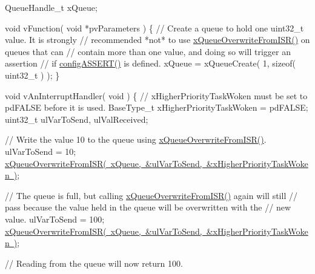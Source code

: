 \begin{DoxyPre} QueueHandle\_t xQueue;\end{DoxyPre}



\begin{DoxyPre} void vFunction( void *pvParameters )
 \{
    // Create a queue to hold one uint32\_t value.  It is strongly
    // recommended *not* to use \mbox{\hyperlink{queue_8h_abdcd6a86ef82034d002193e79cfd3ce8}{xQueueOverwriteFromISR()}} on queues that can
    // contain more than one value, and doing so will trigger an assertion
    // if \mbox{\hyperlink{_free_r_t_o_s_8h_a228c70cd48927d6ab730ed1a6dfbe35f}{configASSERT()}} is defined.
    xQueue = xQueueCreate( 1, sizeof( uint32\_t ) );
\}\end{DoxyPre}



\begin{DoxyPre}void vAnInterruptHandler( void )
\{
// xHigherPriorityTaskWoken must be set to pdFALSE before it is used.
BaseType\_t xHigherPriorityTaskWoken = pdFALSE;
uint32\_t ulVarToSend, ulValReceived;\end{DoxyPre}



\begin{DoxyPre}    // Write the value 10 to the queue using \mbox{\hyperlink{queue_8h_abdcd6a86ef82034d002193e79cfd3ce8}{xQueueOverwriteFromISR()}}.
    ulVarToSend = 10;
    \mbox{\hyperlink{queue_8h_abdcd6a86ef82034d002193e79cfd3ce8}{xQueueOverwriteFromISR( xQueue, \&ulVarToSend, \&xHigherPriorityTaskWoken )}};\end{DoxyPre}



\begin{DoxyPre}    // The queue is full, but calling \mbox{\hyperlink{queue_8h_abdcd6a86ef82034d002193e79cfd3ce8}{xQueueOverwriteFromISR()}} again will still
    // pass because the value held in the queue will be overwritten with the
    // new value.
    ulVarToSend = 100;
    \mbox{\hyperlink{queue_8h_abdcd6a86ef82034d002193e79cfd3ce8}{xQueueOverwriteFromISR( xQueue, \&ulVarToSend, \&xHigherPriorityTaskWoken )}};\end{DoxyPre}



\begin{DoxyPre}    // Reading from the queue will now return 100.\end{DoxyPre}



